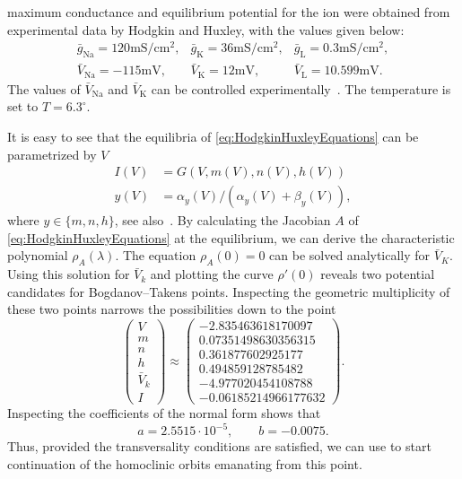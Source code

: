maximum conductance and equilibrium potential for the ion were obtained from
experimental data by Hodgkin and Huxley, with the values given below:
\[
\begin{array}{lll}
\bar{g}_{\mathrm{Na}}=120 \mathrm{mS} / \mathrm{cm}^{2}, 
& \bar{g}_{\mathrm{K}}=36 \mathrm{mS} / \mathrm{cm}^{2}, 
& \bar{g}_{\mathrm{L}}=0.3 \mathrm{mS} / \mathrm{cm}^{2}, \\
\bar{V}_{\mathrm{Na}}=-115 \mathrm{mV},
& \bar{V}_{\mathrm{K}}=12 \mathrm{mV}, 
& \bar{V}_{\mathrm{L}}=10.599 \mathrm{mV}.
\end{array}
\]
The values of $\bar{V}_{\mathrm{Na}}$ and $\bar{V}_{\mathrm{K}}$ can be
controlled experimentally~\cite{HodgkinHuxley1952a,Jack1975ElectricCurrentFlow}.
The temperature is set to $T=6.3^{\circ}$.

It is easy to see that the equilibria of \cref{eq:HodgkinHuxleyEquations} can be
parametrized by $V$
\begin{equation*}
    \begin{aligned}
        I(V) &= G(V, m(V), n(V), h(V)) \\
        y(V) &= \alpha_y(V)/(\alpha_y(V)+\beta_y(V)),
    \end{aligned}
\end{equation*}
where $y\in\{m,n,h\}$, see also~\cite{Guckenheimer@1993}. By calculating the Jacobian $A$ of
\cref{eq:HodgkinHuxleyEquations} at the equilibrium, we can derive the
characteristic polynomial $\rho_A(\lambda)$. The equation $\rho_A(0)=0$ can be
solved analytically for $\bar V_K$. Using this solution for $\bar V_k$ and
plotting the curve $\rho'(0)$ reveals two potential candidates for Bogdanov--Takens
points. Inspecting the geometric multiplicity of these two points narrows the
possibilities down to the point
\begin{equation}
\label{eq:HodgkinHuxleyBTpoint}
\begin{pmatrix}
    V \\m \\n \\h \\ \bar V_k \\ I 
\end{pmatrix}
\approx
\begin{pmatrix}
-2.835463618170097 \\ 0.07351498630356315 \\ 0.361877602925177 \\ 0.494859128785482 \\
-4.977020454108788 \\ -0.06185214966177632
\end{pmatrix}.
\end{equation}  
Inspecting the coefficients of the normal form shows that
\[
a = 2.5515\cdot 10^{-5}, \qquad b =  -0.0075.
\] 
Thus, provided the transversality conditions are satisfied, we can use \MATCONT to
start continuation of the homoclinic orbits emanating from this point.

